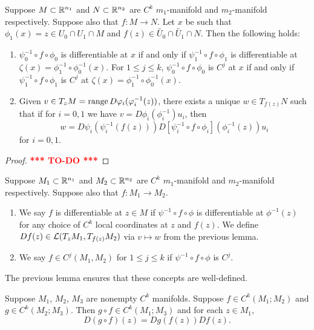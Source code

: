 \documentclass[a4paper]{article}
\newcommand{\TODO}{\textcolor{red}{\textbf{*** TO-DO ***}}}
\begin{document}
\begin{lemma}
Suppose $M \subset \mathbb{R}^{n_1}$ and $N \subset \mathbb{R}^{n_2}$ are
$C^k$ $m_1$-manifold and $m_2$-manifold respectively.
Suppose also that $f : M \to N$.
Let $x$ be such that $\phi_1(x) = z \in U_0 \cap U_1 \cap M$
and $f(z) \in \tilde{U_0} \cap \tilde{U_1} \cap N$.
Then the following holds:
\begin{enumerate}
\item $\psi_0^{-1} \circ f \circ \phi_0$ is differentiable
at $x$ if and only if $\psi_1^{-1} \circ f \circ \phi_1$
is differentiable at $\zeta(x) = \phi_1^{-1} \circ 
\phi_0^{-1} (x)$. For $1 \leq j \leq k$, 
$\psi_0^{-1} \circ f \circ \phi_0$ is $C^j$
at $x$ if and only if $\psi_1^{-1} \circ f \circ \phi_1$
is $C^j$ at $\zeta(x) = \phi_1^{-1} \circ 
\phi_0^{-1} (x)$.

\item Given $v \in T_z M = \operatorname{range} D \varphi_i (\varphi_i^{-1}(z))$,
there exists a unique $w \in T_{f(z)} N$ such that if
for $i = 0, 1$ we have
$v = D \phi_i (\phi_i^{-1}) u_i$, then
\[
w = D \psi_i (\psi_i^{-1} (f(z)))
D [\psi_i^{-1} \circ f \circ \phi_i] (\phi_i^{-1}(z)) u_i
\]
for $i = 0, 1$.
\end{enumerate}
\end{lemma}

\begin{proof}
\TODO
\end{proof}

\begin{defi}
Suppose $M_1 \subset \mathbb{R}^{n_1}$ and $M_2 \subset \mathbb{R}^{n_2}$ are
$C^k$ $m_1$-manifold and $m_2$-manifold respectively.
Suppose also that $f : M_1 \to M_2$.

\begin{enumerate}
\item We say $f$ is differentiable at $z \in M$
if $\psi^{-1} \circ f \circ \phi$ is differentiable
at $\phi^{-1}(z)$ for any choice of $C^k$ local coordinates
at $z$ and $f(z)$. We define
$Df(z) \in \mathcal{L}(T_z M_1, T_{f(z)} M_2)$ via $v \mapsto w$
from the previous lemma.

\item We say $f \in C^j (M_1, M_2)$ for $1 \leq j \leq k$
if $\psi^{-1} \circ f \circ \phi$ is $C^j$.
\end{enumerate}
\end{defi}

The previous lemma ensures that these concepts are 
well-defined.

\begin{thm}
Suppose $M_1$, $M_2$, $M_3$ are nonempty $C^k$ manifolds.
Suppose $f \in C^k(M_1; M_2)$ and $g \in C^k(M_2; M_3)$.
Then $g \circ f \in C^k (M_1; M_3)$ and for each $z \in M_1$,
\[
D (g \circ f)(z) = D g (f(z)) D f(z).
\]
\end{thm}
\end{document}
